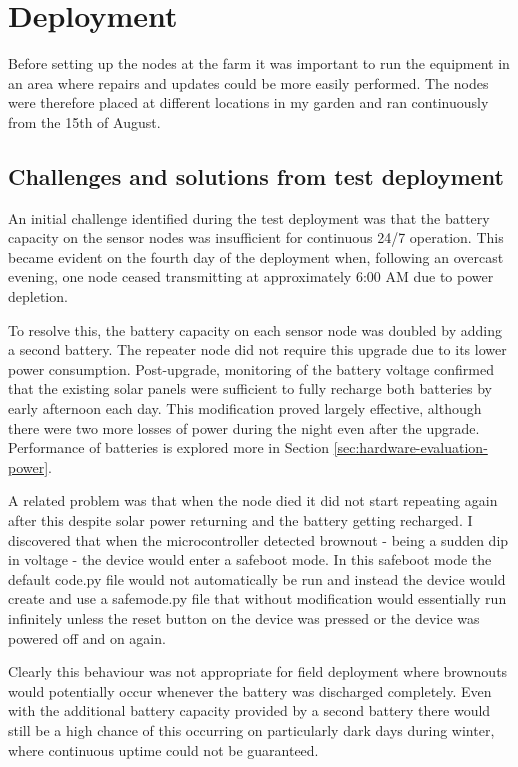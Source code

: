 \section{Deployment}\label{sec:deployment}

Before setting up the nodes at the farm it was important to run the equipment in
an area where repairs and updates could be more easily performed. The nodes were
therefore placed at different locations in my garden and ran continuously from
the 15th of August.

\subsection{Challenges and solutions from test deployment}

An initial challenge identified during the test deployment was that the battery
capacity on the sensor nodes was insufficient for continuous 24/7 operation.
This became evident on the fourth day of the deployment when, following an
overcast evening, one node ceased transmitting at approximately 6:00 AM due to
power depletion.

To resolve this, the battery capacity on each sensor node was doubled by adding
a second battery. The repeater node did not require this upgrade due to its
lower power consumption. Post-upgrade, monitoring of the battery voltage
confirmed that the existing solar panels were sufficient to fully recharge both
batteries by early afternoon each day. This modification proved largely
effective, although there were two more losses of power during the night even
after the upgrade. Performance of batteries is explored more in Section
\ref{sec:hardware-evaluation-power}.

A related problem was that when the node died it did not start repeating again
after this despite solar power returning and the battery getting recharged. I
discovered that when the microcontroller detected brownout - being a sudden dip
in voltage - the device would enter a safeboot mode. In this safeboot mode the
default code.py file would not automatically be run and instead the device would
create and use a safemode.py file that without modification would essentially
run infinitely unless the reset button on the device was pressed or the device
was powered off and on again.

Clearly this behaviour was not appropriate for field deployment where brownouts
would potentially occur whenever the battery was discharged completely. Even
with the additional battery capacity provided by a second battery there would
still be a high chance of this occurring on particularly dark days during
winter, where continuous uptime could not be guaranteed.

